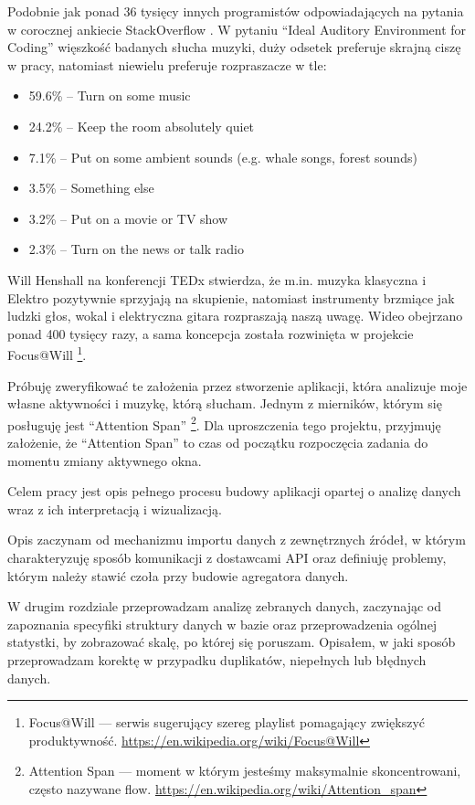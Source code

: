 \documentclass[openright]{xmgr}
\begin{document}
    Podobnie jak ponad 36 tysięcy innych programistów odpowiadających na pytania w corocznej ankiecie StackOverflow \cite{stackoverflow:survey2017}.
    W pytaniu ``Ideal Auditory Environment for Coding''
    więszkość badanych słucha muzyki, duży odsetek preferuje skrajną ciszę w pracy, natomiast niewielu preferuje rozpraszacze w tle:
    \begin{itemize}
        \item 59.6\% -- Turn on some music
        \item 24.2\% -- Keep the room absolutely quiet
        \item 7.1\% -- Put on some ambient sounds (e.g. whale songs, forest sounds)
        \item 3.5\% -- Something else
        \item 3.2\% -- Put on a movie or TV show
        \item 2.3\% -- Turn on the news or talk radio
    \end{itemize}

    Will Henshall na konferencji TEDx \cite{tedx:music-at-work} stwierdza, że m.in. muzyka klasyczna i Elektro pozytywnie sprzyjają na skupienie,
    natomiast instrumenty brzmiące jak ludzki głos, wokal i elektryczna gitara rozpraszają naszą uwagę.
    Wideo obejrzano ponad 400 tysięcy razy, a sama koncepcja została rozwinięta w projekcie Focus@Will
    \footnote{Focus@Will --- serwis sugerujący szereg playlist pomagający zwiększyć produktywność. \url{https://en.wikipedia.org/wiki/Focus@Will}}.

    Próbuję zweryfikować te założenia przez stworzenie aplikacji, która analizuje moje własne aktywności i muzykę, którą słucham.
    Jednym z mierników, którym się posługuję jest ``Attention Span''
    \footnote{Attention Span --- moment w którym jesteśmy maksymalnie skoncentrowani,
    często nazywane flow. \url{https://en.wikipedia.org/wiki/Attention_span}}.
    Dla uproszczenia tego projektu, przyjmuję założenie, że ``Attention Span'' to czas od początku rozpoczęcia zadania do momentu zmiany aktywnego okna.

    Celem pracy jest opis pełnego procesu budowy aplikacji opartej o analizę danych wraz z ich interpretacją i wizualizacją.

    Opis zaczynam od mechanizmu importu danych z zewnętrznych źródeł, w którym charakteryzuję sposób komunikacji z dostawcami API
    oraz definiuję problemy, którym należy stawić czoła przy budowie agregatora danych.

    W drugim rozdziale przeprowadzam analizę zebranych danych, zaczynając od zapoznania specyfiki struktury danych w bazie
    oraz przeprowadzenia ogólnej statystki, by zobrazować skalę, po której się poruszam.
    Opisałem, w jaki sposób przeprowadzam korektę w przypadku duplikatów, niepełnych lub błędnych danych.
\end{document}
